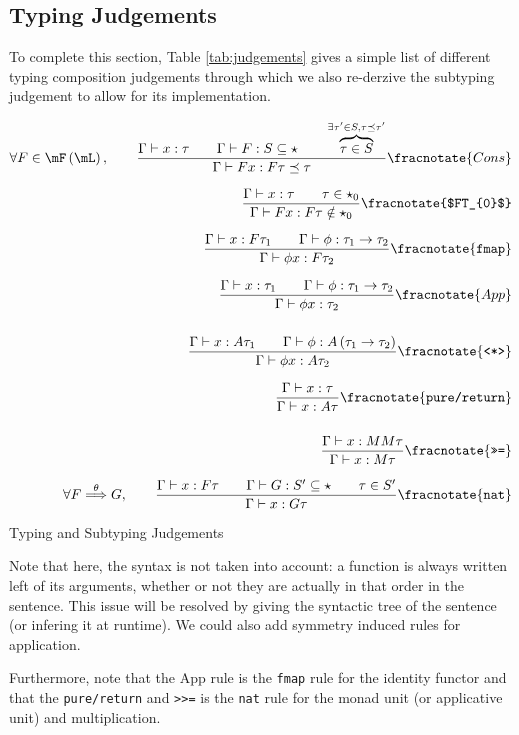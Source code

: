 \documentclass[math, english, info]{cours}
\def\cont{\Gamma\vdash}
\def\poulpe{\qquad}
\begin{document}
\subsection{Typing Judgements}\label{subsec:judgements}
To complete this section, Table \ref{tab:judgements} gives a simple list of different typing composition judgements through which we also re-derzive the subtyping judgement to allow for its implementation.
\begin{table}
\begin{align*}
	\forall F \in \mF\left( \mL \right),\poulpe
	\frac{\cont x: \tau \poulpe \cont F: S\subseteq \star \poulpe \overbrace{\tau \in S}^{\exists \tau'\in S, \tau \preceq \tau'}}{\cont Fx: F\tau \preceq \tau}\fracnotate{Cons}\\[.25cm]
	\frac{\cont x: \tau \poulpe \tau \in \star_{0}}{\cont Fx: F\tau \notin \star_{0}}\fracnotate{$FT_{0}$}\\[.25cm]
	\frac{\cont x: F\tau_{1} \poulpe \cont \phi: \tau_{1} \to \tau_{2}}{\cont \phi x: F\tau_{2} }\fracnotate{\texttt{fmap}}\\[.25cm]
	\frac{\cont x: \tau_{1} \poulpe \cont \phi: \tau_{1} \to \tau_{2}}{\cont \phi x: \tau_{2}}\fracnotate{App}\\[.5cm]
	\frac{\cont x: A\tau_{1} \poulpe \cont \phi: A\left( \tau_{1} \to \tau_{2} \right)}{\cont \phi x: A\tau_{2}}\fracnotate{\texttt{<*>}}\\[.25cm]
	\frac{\cont x: \tau}{\cont x: A\tau}\fracnotate{\texttt{pure/return}}\\[.5cm]
	\frac{\cont x: MM\tau}{\cont x: M\tau}\fracnotate{\texttt{>>=}}\\[.25cm]
	\forall F \overset{\theta}{\Longrightarrow} G,\poulpe \frac{\cont x: F\tau \poulpe \cont G: S' \subseteq \star \poulpe \tau \in S'}{\cont x : G\tau}\fracnotate{\texttt{nat}}
\end{align*}
\caption{Typing and Subtyping Judgements}
\label{tab:judgements}
\end{table}
Note that here, the syntax is not taken into account: a function is always written left of its arguments, whether or not they are actually in that order in the sentence.
This issue will be resolved by giving the syntactic tree of the sentence (or infering it at runtime).
We could also add symmetry induced rules for application.

Furthermore, note that the App rule is the \texttt{fmap} rule for the identity functor and that the \texttt{pure/return} and \texttt{>>=} is the \texttt{nat} rule for the monad unit (or applicative unit) and multiplication.
\end{document}
